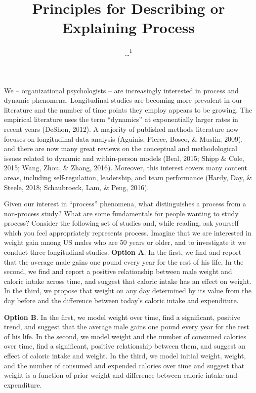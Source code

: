 \documentclass[english,,man]{apa6}
\title{Principles for Describing or Explaining Process}
\author{\ldots{}\textsuperscript{1}}
\date{}
\affiliation{
\vspace{0.5cm}
\textsuperscript{1} ...}
\theoremstyle{definition}
\theoremstyle{definition}
\theoremstyle{definition}
\theoremstyle{remark}
\begin{document}
\maketitle

We -- organizational psychologists -- are increasingly interested in
process and dynamic phenomena. Longitudinal studies are becoming more
prevalent in our literature and the number of time points they employ
appears to be growing. The empirical literature uses the term
\enquote{dynamics} at exponentially larger rates in recent years
(DeShon, 2012). A majority of published methods literature now focuses
on longitudinal data analysis (Aguinis, Pierce, Bosco, \& Muslin, 2009),
and there are now many great reviews on the conceptual and
methodological issues related to dynamic and within-person models (Beal,
2015; Shipp \& Cole, 2015; Wang, Zhou, \& Zhang, 2016). Moreover, this
interest covers many content areas, including self-regulation,
leadership, and team performance (Hardy, Day, \& Steele, 2018;
Schaubroeck, Lam, \& Peng, 2016).

Given our interest in \enquote{process} phenomena, what distinguishes a
process from a non-process study? What are some fundamentals for people
wanting to study process? Consider the following set of studies and,
while reading, ask yourself which you feel appropriately represents
process. Imagine that we are interested in weight gain among US males
who are 50 years or older, and to investigate it we conduct three
longitudinal studies. \textbf{Option A}. In the first, we find and
report that the average male gains one pound every year for the rest of
his life. In the second, we find and report a positive relationship
between male weight and caloric intake across time, and suggest that
caloric intake has an effect on weight. In the third, we propose that
weight on any day determined by its value from the day before and the
difference between today's caloric intake and expenditure.

\textbf{Option B}. In the first, we model weight over time, find a
significant, positive trend, and suggest that the average male gains one
pound every year for the rest of his life. In the second, we model
weight and the number of consumed calories over time, find a
significant, positive relationship between them, and suggest an effect
of caloric intake and weight. In the third, we model initial weight,
weight, and the number of consumed and expended calories over time and
suggest that weight is a function of prior weight and difference between
caloric intake and expenditure.
\end{document}
